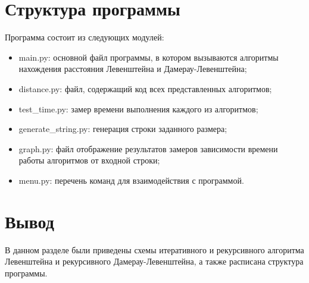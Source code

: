 \section{Структура программы}
Программа состоит из следующих модулей:
\begin{itemize}
	\item main.py: основной файл программы, в котором вызываются алгоритмы нахождения расстояния Левенштейна и Дамерау-Левенштейна;
	\item distance.py: файл, содержащий код всех представленных алгоритмов;
	\item test\_time.py: замер времени выполнения каждого из алгоритмов;
	\item generate\_string.py: генерация строки заданного размера;
	\item graph.py: файл отображение результатов замеров зависимости времени работы алгоритмов от входной строки;
	\item menu.py: перечень команд для взаимодействия с программой.
\end{itemize}

\section*{Вывод}
В данном разделе были приведены схемы итеративного и рекурсивного алгоритма Левенштейна и рекурсивного Дамерау-Левенштейна, а также расписана структура программы.
